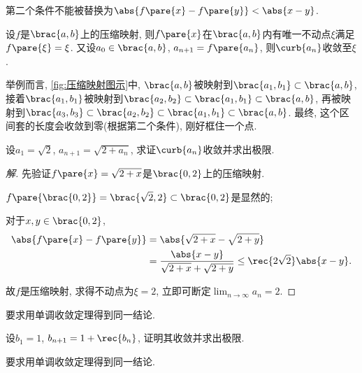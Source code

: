 \documentclass{ctexart}
\begin{document}
\begin{pitfall}
    第二个条件不能被替换为$\abs{f\pare{x} - f\pare{y}} < \abs{x-y}$.
\end{pitfall}
\begin{theorem}[压缩映射原理]
    设$f$是$\brac{a,b}$上的压缩映射, 则$f\pare{x}$在$\brac{a,b}$内有唯一不动点$\xi$满足$f\pare{\xi}=\xi$. 又设$a_0\in\brac{a,b}$, $a_{n+1} = f\pare{a_n}$, 则$\curb{a_n}$收敛至$\xi$.
\end{theorem}
举例而言, \cref{fig:压缩映射图示}中, $\brac{a,b}$被映射到$\brac{a_1,b_1}\subset \brac{a,b}$, 接着$\brac{a_1,b_1}$被映射到$\brac{a_2,b_2}\subset \brac{a_1,b_1}\subset \brac{a,b}$, 再被映射到$\brac{a_3,b_3}\subset\brac{a_2,b_2}\subset \brac{a_1,b_1}\subset \brac{a,b}$. 最终, 这个区间套的长度会收敛到零(根据第二个条件), 刚好框住一个点.
\begin{sample}
    \begin{ex}
        \label{ex:平方根不动点}
        设$a_1 = \sqrt{2}$, $a_{n+1} = \sqrt{2+a_n}$, 求证$\curb{a_n}$收敛并求出极限.
    \end{ex}
    \begin{proof}[解]
        先验证$f\pare{x}=\sqrt{2+x}$是$\brac{0,2}$上的压缩映射.
        \begin{cenum}
            \item $f\pare{\brac{0,2}} = \brac{\sqrt{2},2}\subset\brac{0,2}$是显然的;
            \item 对于$x,y\in\brac{0,2}$, 
            \begin{align*}
                \abs{f\pare{x} - f\pare{y}} &= \abs{\sqrt{2+x} - \sqrt{2+y}}\\&= \frac{\abs{x-y}}{\sqrt{2+x}+\sqrt{2+y}} \le \rec{2\sqrt{2}}\abs{x-y}. 
            \end{align*}
        \end{cenum}
        故$f$是压缩映射, 求得不动点为$\xi = 2$, 立即可断定$\displaystyle \lim_{n\rightarrow\infty}a_n = 2$.
    \end{proof}
    要求用单调收敛定理得到同一结论.
\end{sample}
\begin{sample}
    \begin{ex}
        \label{ex:Newton迭代不动点}
        设$b_1=1$, $\displaystyle b_{n+1} = 1 + \rec{b_n}$, 证明其收敛并求出极限.
    \end{ex}
    要求用单调收敛定理得到同一结论.
\end{sample}
\end{document}
